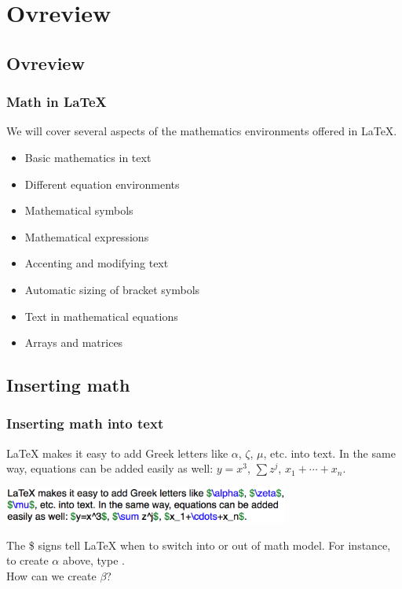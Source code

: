 

\section[Overview]{Ovreview}
\subsection[Overview]{Ovreview}

\begin{frame} \frametitle{Math in LaTeX}
	We will cover several aspects of the mathematics environments offered in LaTeX.
	\begin{itemize}
		\item Basic mathematics in text
		\item Different equation environments
		\item Mathematical symbols
		\item Mathematical expressions
		\item Accenting and modifying text
		\item Automatic sizing of bracket symbols
		\item Text in mathematical equations
		\item Arrays and matrices
	\end{itemize}
\end{frame}

\subsection[Inserting math]{Inserting math}
\begin{frame} \frametitle{Inserting math into text}
	LaTeX makes it easy to add Greek letters like $\alpha$, $\zeta$,
	$\mu$, etc. into text. In the same way, equations can be added
	easily as well: $y=x^3$, $\sum z^j$, $x_1+\cdots+x_n$.
	\begin{center}
		\includegraphics[height=0.47in]{math/images/mathInText}
	\end{center}
	The {\color{braces}\$} signs tell LaTeX when to switch into or out of math model. For instance, to create $\alpha$ above, type . %
	\vspace{5mm} \\
	How can we create $\beta$?
\end{frame}

